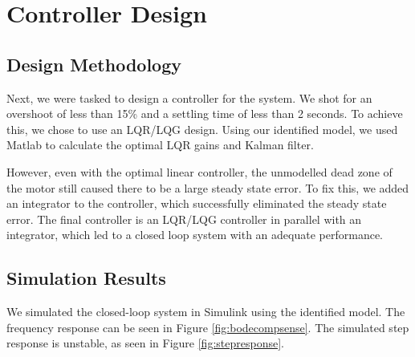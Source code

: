 \documentclass[11pt]{article}
\begin{document}
\clearpage
\section{Controller Design}
\label{sec:control}

\subsection{Design Methodology}

Next, we were tasked to design a controller for the system. We shot for an overshoot of less than 15\%
and a settling time of less than 2 seconds. To achieve this, we chose to use an LQR/LQG design. Using our 
identified model, we used Matlab to calculate the optimal LQR gains and Kalman filter. 

However, even with the optimal linear controller, the unmodelled dead zone of the motor still caused
there to be a large steady state error. To fix this, we added an integrator to the controller, which successfully
eliminated the steady state error. The final controller is an LQR/LQG controller in parallel with an integrator, which led
to a closed loop system with an adequate performance.

\subsection{Simulation Results}
We simulated the closed-loop system in Simulink using the identified model. The frequency response
can be seen in Figure \ref{fig:bodecompsense}. The simulated step response is unstable, as 
seen in Figure \ref{fig:stepresponse}.
\end{document}
